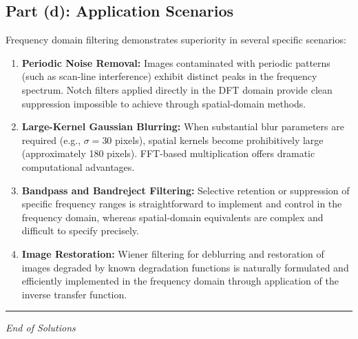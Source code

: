 \documentclass[12pt,a4paper]{article}
\begin{document}
\subsection*{Part (d): Application Scenarios}

Frequency domain filtering demonstrates superiority in several specific scenarios:

\begin{enumerate}
\item \textbf{Periodic Noise Removal:} Images contaminated with periodic patterns (such as scan-line interference) exhibit distinct peaks in the frequency spectrum. Notch filters applied directly in the DFT domain provide clean suppression impossible to achieve through spatial-domain methods.

\item \textbf{Large-Kernel Gaussian Blurring:} When substantial blur parameters are required (e.g., $\sigma = 30$ pixels), spatial kernels become prohibitively large (approximately 180 pixels). FFT-based multiplication offers dramatic computational advantages.

\item \textbf{Bandpass and Bandreject Filtering:} Selective retention or suppression of specific frequency ranges is straightforward to implement and control in the frequency domain, whereas spatial-domain equivalents are complex and difficult to specify precisely.

\item \textbf{Image Restoration:} Wiener filtering for deblurring and restoration of images degraded by known degradation functions is naturally formulated and efficiently implemented in the frequency domain through application of the inverse transfer function.
\end{enumerate}

\vspace{2.0cm}
\noindent\rule{\textwidth}{0.5pt}
\begin{center}
\textit{End of Solutions}
\end{center}
\end{document}

